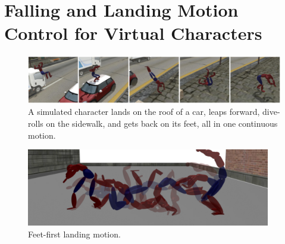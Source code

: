 \chapter{Falling and Landing Motion Control for Virtual Characters}

\graphicspath{{landing/}}

\begin{figure}[ht]
\center
\includegraphics[width=\textwidth]{images/teaser2}
  \caption{A simulated character lands on the roof of a car, leaps
    forward, dive-rolls on the sidewalk, and gets back on its feet,
    all in one continuous motion.}
  \label{fig:landing_teaser}
\end{figure}








\begin{figure}[ht]
\center
  \includegraphics[width=0.95\textwidth]{images/ResultRoll}
  \caption{Feet-first landing motion.}
  \label{fig:landing_resultFeet}

\end{figure}


